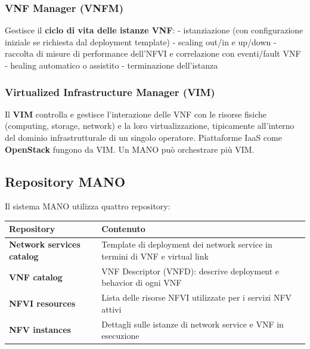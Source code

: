 \documentclass[
  italian,
  openany]{book}
\newcounter{none} %
\begin{document}
\subsubsection{VNF Manager (VNFM)}\label{vnf-manager-vnfm}

Gestisce il \textbf{ciclo di vita delle istanze VNF}: - istanziazione
(con configurazione iniziale se richiesta dal deployment template) -
scaling out/in e up/down - raccolta di misure di performance dell'NFVI e
correlazione con eventi/fault VNF - healing automatico o assistito -
terminazione dell'istanza

\subsubsection{Virtualized Infrastructure Manager
(VIM)}\label{virtualized-infrastructure-manager-vim}

Il \textbf{VIM} controlla e gestisce l'interazione delle VNF con le
risorse fisiche (computing, storage, network) e la loro
virtualizzazione, tipicamente all'interno del dominio infrastrutturale
di un singolo operatore. Piattaforme IaaS come \textbf{OpenStack}
fungono da VIM. Un MANO può orchestrare più VIM.

\subsection{Repository MANO}\label{repository-mano}

Il sistema MANO utilizza quattro repository:

{\def\LTcaptype{none} %
\begin{longtable}[]{@{}
  >{\raggedright\arraybackslash}p{}
  >{\raggedright\arraybackslash}p{}@{}}
\toprule\noalign{}
\begin{minipage}[b]{\linewidth}\raggedright
Repository
\end{minipage} & \begin{minipage}[b]{\linewidth}\raggedright
Contenuto
\end{minipage} \\
\midrule\noalign{}
\endhead
\bottomrule\noalign{}
\endlastfoot
\textbf{Network services catalog} & Template di deployment dei network
service in termini di VNF e virtual link \\
\textbf{VNF catalog} & VNF Descriptor (VNFD): descrive deployment e
behavior di ogni VNF \\
\textbf{NFVI resources} & Lista delle risorse NFVI utilizzate per i
servizi NFV attivi \\
\textbf{NFV instances} & Dettagli sulle istanze di network service e VNF
in esecuzione \\
\end{longtable}
}
\end{document}
